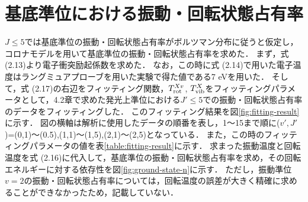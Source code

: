 \section{基底準位における振動・回転状態占有率}
$J \leq 5$では基底準位の振動・回転状態占有率がボルツマン分布に従うと仮定し，コロナモデルを用いて基底準位の振動・回転状態占有率を求めた．
まず，式 (2.13)より電子衝突励起係数を求めた．
なお，この時に式 (2.14)で用いた電子温度はラングミュアプローブを用いた実験で得た値である7 eV\cite{yun}を用いた．
そして，式 (2.17)の右辺をフィッティング関数，$T^{Xv}_{\rm rot}$, $T^X_{\rm vib}$をフィッティングパラメータとして，4.2章で求めた発光上準位における$J' \leq 5$での振動・回転状態占有率のデータをフィッティングした．
このフィッティング結果を図\ref{fig:fitting-result}に示す．
図の横軸は解析に使用したデータの順番を表し，1〜15まで順に($v',J'$)=(0,1)〜(0.5),(1,1)〜(1,5),(2,1)〜(2,5)となっている．
また，この時のフィッティングパラメータの値を表\ref{table:fitting-result}に示す．
求まった振動温度と回転温度を式 (2.16)に代入して，基底準位の振動・回転状態占有率を求め，その回転エネルギーに対する依存性を図\ref{fig:ground-state-n}に示す．
ただし，振動準位$v=2$の振動・回転状態占有率については，回転温度の誤差が大きく精確に求めることができなかったため，記載していない．